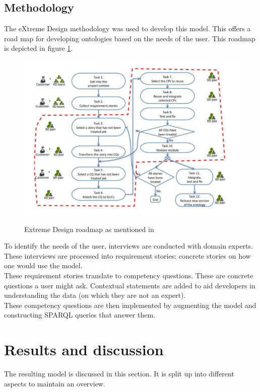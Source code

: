 \documentclass[12pt,journal]{IEEEtran}
\begin{document}
\subsection{Methodology}

\noindent The eXtreme Design methodology \cite{xd} was used to develop this model. This offers a road map for developing ontologies based on the needs of the user.
This roadmap is depicted in figure \ref{fig:xd-diagram}.

\begin{figure}
	\caption[Extreme Design roadmap]{Extreme Design roadmap as mentioned in \cite{xd}}
	\centering
	\includegraphics[scale=0.75]{xd-diagram.PNG}
	\label{fig:xd-diagram}
\end{figure}
\noindent To identify the needs of the user, interviews are conducted with domain experts. These interviews are processed into requirement stories: concrete stories on how one would use the model.\\
These requirement stories translate to competency questions. These are concrete questions a user might ask.
Contextual statements are added to aid developers in understanding the data (on which they are not an expert).\\
These competency questions are then implemented by augmenting the model and constructing SPARQL queries that answer them.

\section{Results and discussion}

\noindent The resulting model is discussed in this section. It is split up into different aspects to maintain an overview.
\end{document}
